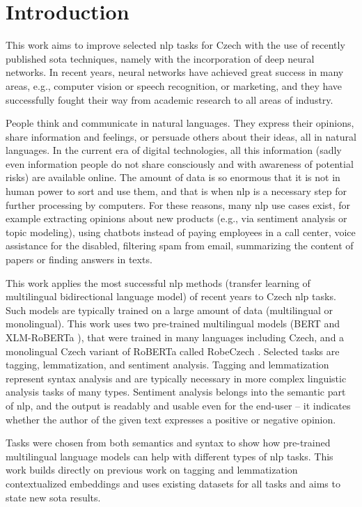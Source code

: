 \chapter*{Introduction}
This work aims to improve selected \acrfull{nlp} tasks for Czech with the use of recently published \acrlong{sota} techniques, namely with the incorporation of deep neural networks. In recent years, neural networks have achieved great success in many areas, e.g., computer vision or speech recognition, or marketing, and they have successfully fought their way from academic research to all areas of industry. 
\par
People think and communicate in natural languages. They express their opinions, share information and feelings, or persuade others about their ideas, all in natural languages. In the current era of digital technologies, all this information (sadly even information people do not share consciously and with awareness of potential risks) are available online. The amount of data is so enormous that it is not in human power to sort and use them, and that is when \acrshort{nlp} is a necessary step for further processing by computers. For these reasons, many \acrshort{nlp} use cases exist, for example extracting opinions about new products (e.g., via sentiment analysis or topic modeling), using chatbots instead of paying employees in a call center, voice assistance for the disabled, filtering spam from email, summarizing the content of papers or finding answers in texts. \par
This work applies the most successful \gls{nlp} methods (transfer learning of multilingual bidirectional language model) of recent years to Czech \acrlong{nlp} tasks. Such models are typically trained on a large amount of data (multilingual or monolingual). This work uses two pre-trained multilingual models (BERT\citep{Devlin2019} and XLM-RoBERTa \citep{Conneau2019}), that were trained in many languages including Czech, and a monolingual Czech variant of RoBERTa called RobeCzech \citep{Straka2021}. Selected tasks are tagging, lemmatization, and sentiment analysis. Tagging and lemmatization represent syntax analysis and are typically necessary in more complex linguistic analysis tasks of many types. Sentiment analysis belongs into the semantic part of \acrshort{nlp}, and the output is readably and usable even for the end-user -- it indicates whether the author of the given text expresses a positive or negative opinion. \par
Tasks were chosen from both semantics and syntax to show how pre-trained multilingual language models can help with different types of \gls{nlp} tasks. This work builds directly on previous work on tagging and lemmatization contextualized embeddings \citep{straka2019czech} and uses existing datasets for all tasks and aims to state new \acrfull{sota} results.
